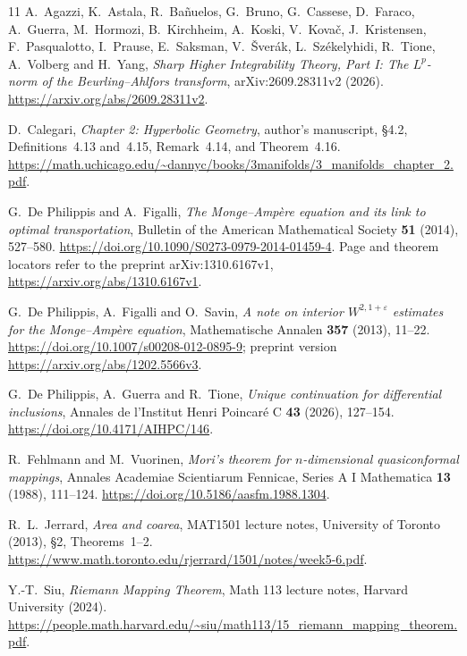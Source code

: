 \documentclass[11pt]{article}
\theoremstyle{remark}
\numberwithin{equation}{section}
\begin{document}
\begingroup
\small
\raggedright
\begin{thebibliography}{11}
A.~Agazzi, K.~Astala, R.~Ba\~nuelos, G.~Bruno, G.~Cassese,
D.~Faraco, A.~Guerra, M.~Hormozi, B.~Kirchheim, A.~Koski,
V.~Kova\v{c}, J.~Kristensen, F.~Pasqualotto, I.~Prause,
E.~Saksman, V.~\v{S}ver\'ak, L.~Sz\'ekelyhidi, R.~Tione,
A.~Volberg and H.~Yang,
\emph{Sharp Higher Integrability Theory, Part I:
The \(L^p\)-norm of the Beurling--Ahlfors transform},
arXiv:2609.28311v2 (2026).
\url{https://arxiv.org/abs/2609.28311v2}.

D.~Calegari, \emph{Chapter 2: Hyperbolic Geometry},
author's manuscript, \S4.2, Definitions~4.13 and~4.15, Remark~4.14,
and Theorem~4.16.
\url{https://math.uchicago.edu/~dannyc/books/3manifolds/3_manifolds_chapter_2.pdf}.

G.~De Philippis and A.~Figalli,
\emph{The Monge--Amp\`ere equation and its link to optimal transportation},
Bulletin of the American Mathematical Society \textbf{51} (2014), 527--580.
\url{https://doi.org/10.1090/S0273-0979-2014-01459-4}.
Page and theorem locators refer to the preprint arXiv:1310.6167v1,
\url{https://arxiv.org/abs/1310.6167v1}.

G.~De Philippis, A.~Figalli and O.~Savin,
\emph{A note on interior \(W^{2,1+\varepsilon}\) estimates for the
Monge--Amp\`ere equation},
Mathematische Annalen \textbf{357} (2013), 11--22.
\url{https://doi.org/10.1007/s00208-012-0895-9};
preprint version \url{https://arxiv.org/abs/1202.5566v3}.

G.~De Philippis, A.~Guerra and R.~Tione,
\emph{Unique continuation for differential inclusions},
Annales de l'Institut Henri Poincar\'e C \textbf{43} (2026), 127--154.
\url{https://doi.org/10.4171/AIHPC/146}.

R.~Fehlmann and M.~Vuorinen,
\emph{Mori's theorem for \(n\)-dimensional quasiconformal mappings},
Annales Academiae Scientiarum Fennicae, Series A I Mathematica
\textbf{13} (1988), 111--124.
\url{https://doi.org/10.5186/aasfm.1988.1304}.

R.~L.~Jerrard, \emph{Area and coarea},
MAT1501 lecture notes, University of Toronto (2013), \S2, Theorems~1--2.
\url{https://www.math.toronto.edu/rjerrard/1501/notes/week5-6.pdf}.

Y.-T.~Siu, \emph{Riemann Mapping Theorem},
Math 113 lecture notes, Harvard University (2024).
\url{https://people.math.harvard.edu/~siu/math113/15_riemann_mapping_theorem.pdf}.


\end{thebibliography}
\end{document}
